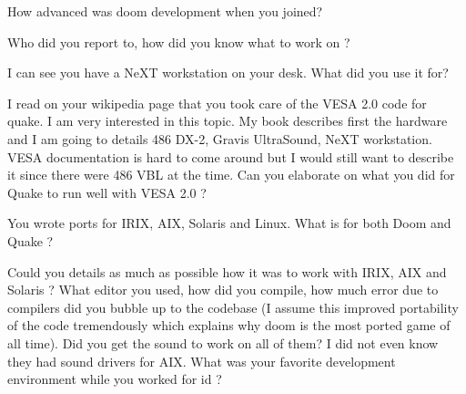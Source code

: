 How advanced was doom development when you joined?\\ \par
{}
\par

Who did you report to, how did you know what to work on ? \\ \par
{}
\par


I can see you have a NeXT workstation on your desk. What did you use it for? \\ \par
{}
\par


I read on your wikipedia page that you took care of the VESA 2.0 code for quake. I am very interested in this topic. My book describes first the hardware and I am going to details 486 DX-2, Gravis UltraSound, NeXT workstation. VESA documentation is hard to come around but I would still want to describe it since there were 486 VBL at the time. Can you elaborate on what you did for Quake to run well with VESA 2.0 ?\\ \par
{}
\par


You wrote ports for IRIX, AIX, Solaris and Linux. What is for both Doom and Quake ?\\ \par
{}
\par



Could you details as much as possible how it was to work with IRIX, AIX and Solaris ? What editor you used, how did you compile, how much error due to compilers did you bubble up to the codebase (I assume this improved portability of the code tremendously which explains why doom is the most ported game of all time).  Did you get the sound to work on all of them? I did not even know they had sound drivers for AIX. What was your favorite development environment while you worked for id ?\\ \par

